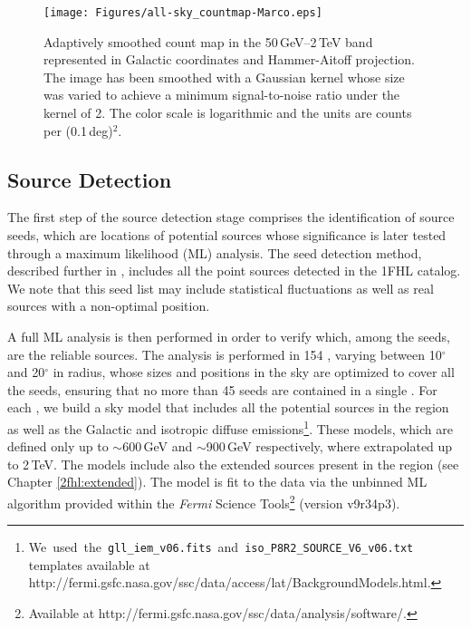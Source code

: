 \begin{figure}[!ht]
    \begin{centering} 
        \texttt{[image: Figures/all-sky\_countmap-Marco.eps]}
        \caption[Adaptively smoothed count map in the 50\,GeV--2\,TeV band]{Adaptively smoothed count map in the 50\,GeV--2\,TeV band represented in Galactic coordinates and Hammer-Aitoff projection. The image has been smoothed with a Gaussian kernel whose size was varied to achieve a minimum signal-to-noise ratio under the kernel of 2. The color scale is logarithmic and the units are counts per (0.1\,deg)$^2$.
            \label{fig:skymap}}
    \end{centering}
\end{figure}


\subsection{\label{2fhl:sourceDetect}Source Detection}


The first step of the source detection stage comprises the identification of source seeds, which are locations of potential sources whose significance is later tested through a maximum likelihood (ML) analysis. The seed detection method, described further in \cite{2FHL}, includes all the point sources detected in the 1FHL catalog. We note that  this seed list may include statistical fluctuations as well as real sources with a non-optimal position.

A full ML analysis is then performed in order to verify which,
among the seeds, are the reliable sources. 
The analysis is performed in 154 \rois{}, varying between 10$^{\circ}$ and 20$^{\circ}$ in radius, whose sizes and positions in the sky are optimized to cover all the seeds, ensuring that no more than 45 seeds are contained in a single \roi{}.
For each \roi{}, we build
a sky model that includes all the potential sources in the region
as well as the  Galactic and isotropic diffuse emissions\footnote{We~used~the~{\tt gll\_iem\_v06.fits}~and~{\tt iso\_P8R2\_SOURCE\_V6\_v06.txt}
    templates available at \\
    http://fermi.gsfc.nasa.gov/ssc/data/access/lat/BackgroundModels.html.}.
These models, which are defined only up to $\sim$600\,GeV and  $\sim$900\,GeV respectively, where extrapolated up to 2\,TeV.
The \roi{} models include also the extended sources present in the region (see Chapter \ref{2fhl:extended}).
The model is fit to the data via the unbinned ML algorithm provided
within the {\it Fermi} Science Tools\footnote{Available at 
    http://fermi.gsfc.nasa.gov/ssc/data/analysis/software/.} (version v9r34p3).

